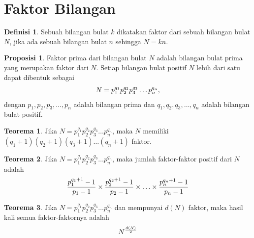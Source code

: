 \documentclass[aspectratio=169]{beamer}
\theoremstyle{definition}
\newtheorem{definisi}{Definisi}
\newtheorem{proposisi}{Proposisi}
\newtheorem{teorema}{Teorema}
\begin{document}
\section{Faktor Bilangan}
\begin{frame}{\insertsection}
  \begin{definisi}
    Sebuah bilangan bulat $k$ dikatakan faktor dari sebuah bilangan bulat $N$, jika ada sebuah bilangan bulat $n$ sehingga $N=kn$.
  \end{definisi}
  \begin{proposisi}
    Faktor prima dari bilangan bulat $N$ adalah bilangan bulat prima yang merupakan faktor dari $N$. Setiap bilangan bulat positif $N$ lebih dari satu dapat dibentuk sebagai
    \begin{align}
      N=p_1^{q_1}p_2^{q_2}p_3^{q_3}\ldots p_n^{q_n}, \notag
    \end{align}
    dengan $p_1,p_2,p_3,\ldots,p_n$ adalah bilangan prima dan $q_1,q_2,q_3,\ldots,q_n$ adalah bilangan bulat positif.
  \end{proposisi}

\end{frame}
\begin{frame}{\insertsection}
  \begin{teorema}\label{thm:banyak_faktor}
    Jika $N=p_1^{q_1}p_2^{q_2}p_3^{q_3}\ldots p_n^{q_n}$, maka $N$ memiliki $(q_1+1)(q_2+1)(q_3+1)\ldots(q_n+1)$ faktor.
  \end{teorema}
  \begin{teorema}\label{thm:jumlah_faktor_positif}
    Jika $N=p_1^{q_1}p_2^{q_2}p_3^{q_3}\ldots p_n^{q_n}$, maka jumlah faktor-faktor positif dari $N$ adalah
    \begin{align}
      \frac{p_1^{q_1+1}-1}{p_1-1} \times \frac{p_2^{q_2+1}-1}{p_2-1} \times \ldots \times \frac{p_n^{q_n+1}-1}{p_n-1} \notag
    \end{align}
  \end{teorema}
  \begin{teorema}\label{thm:hasil_kali_faktor}
    Jika $N=p_1^{q_1}p_2^{q_2}p_3^{q_3}\ldots p_n^{q_n}$ dan mempunyai $d(N)$ faktor, maka hasil kali semua faktor-faktornya adalah
    \begin{align}
      N^{\frac{d(N)}{2}} \notag
    \end{align}
  \end{teorema}
\end{frame}
\end{document}

